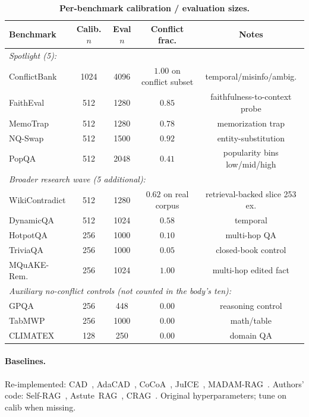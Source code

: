 \begin{table}[H]
\centering
\small
\caption{\textbf{Per-benchmark calibration / evaluation sizes.}}
\label{tab:scope-detailed}
\begin{tabular}{lcccc}
\toprule
\textbf{Benchmark} & \textbf{Calib. $n$} & \textbf{Eval $n$} & \textbf{Conflict frac.} & \textbf{Notes}\\
\midrule
\multicolumn{5}{l}{\emph{Spotlight (5):}}\\
ConflictBank   & 1024 & 4096 & $1.00$ on conflict subset & temporal/misinfo/ambig.\\
FaithEval      & 512  & 1280 & $0.85$ & faithfulness-to-context probe\\
MemoTrap       & 512  & 1280 & $0.78$ & memorization trap\\
NQ-Swap        & 512  & 1500 & $0.92$ & entity-substitution\\
PopQA          & 512  & 2048 & $0.41$ & popularity bins low/mid/high\\
\midrule
\multicolumn{5}{l}{\emph{Broader research wave (5 additional):}}\\
WikiContradict & 512  & 1280 & $0.62$ on real corpus & retrieval-backed slice 253 ex.\\
DynamicQA      & 512  & 1024 & $0.58$ & temporal\\
HotpotQA       & 256  & 1000 & $0.10$ & multi-hop QA\\
TriviaQA       & 256  & 1000 & $0.05$ & closed-book control\\
MQuAKE-Rem.    & 256  & 1024 & $1.00$ & multi-hop edited fact\\
\midrule
\multicolumn{5}{l}{\emph{Auxiliary no-conflict controls (not counted in the body's ten):}}\\
GPQA           & 256  & 448  & $0.00$ & reasoning control\\
TabMWP         & 256  & 1000 & $0.00$ & math/table\\
CLIMATEX       & 128  & 250  & $0.00$ & domain QA\\
\bottomrule
\end{tabular}
\end{table}

\paragraph{Baselines.}
Re-implemented: CAD~\citep{shi2024cad},
AdaCAD~\citep{wang2025adacad},
CoCoA~\citep{khandelwal2025cocoa},
JuICE~\citep{li2025taming},
MADAM-RAG~\citep{wang2025ramdocs}.  Authors' code:
Self-RAG~\citep{asai2024selfrag},
Astute~RAG~\citep{wang2024astuterag},
CRAG~\citep{yan2024crag}.  Original hyperparameters; tune on calib
when missing.

